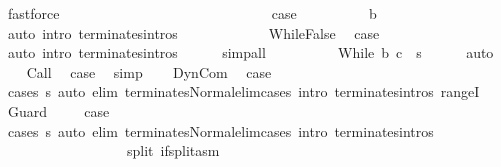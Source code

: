 \begin{isabellebody}
\ fastforce\isanewline
\ \ \ \ \ \ \ \ \isamarkupfalse%
\isanewline
\ \ \ \ \ \ \isacommand{{\isacharbraceright}}\isamarkupfalse%
\isanewline
\ \ \ \ \ \ \isamarkupfalse%
\isanewline
\ \ \ \ \ \ \isamarkupfalse%
\ {\isacharquery}case\isanewline
\ \ \ \ \ \ \ \ \isamarkupfalse%
\ b\isanewline
\ \ \ \ \ \ \ \ \isamarkupfalse%
\ {\isacharparenleft}auto\ intro{\isacharcolon}\ terminates{\isachardot}intros{\isacharparenright}\isanewline
\ \ \ \ \isamarkupfalse%
\isanewline
\ \ \ \ \ \ \isamarkupfalse%
\ WhileFalse\ \isamarkupfalse%
\ {\isacharquery}case\ \isamarkupfalse%
\ {\isacharparenleft}auto\ intro{\isacharcolon}\ terminates{\isachardot}intros{\isacharparenright}\isanewline
\ \ \ \ \isamarkupfalse%
\ simp{\isacharunderscore}all\isanewline
\ \ \isacommand{{\isacharbraceright}}\isamarkupfalse%
\ \isanewline
\ \ \isamarkupfalse%
\ \isamarkupfalse%
\ {\isachardoublequoteopen}{\isasymGamma}{\isasymturnstile}While\ b\ c\ {\isasymdown}\ s{\isachardoublequoteclose}\isanewline
\ \ \ \ \isamarkupfalse%
\ auto\isanewline
{}\isamarkupfalse%
\isanewline
\ \ \isamarkupfalse%
\ Call\ \isamarkupfalse%
\ {\isacharquery}case\ \isamarkupfalse%
\ simp\isanewline
{}\isamarkupfalse%
\isanewline
\ \ \isamarkupfalse%
\ DynCom\ \isamarkupfalse%
\ {\isacharquery}case\ \isanewline
\ \ \ \ \ \isamarkupfalse%
\ {\isacharparenleft}cases\ s{\isacharparenright}\ {\isacharparenleft}auto\ elim{\isacharcolon}\ terminates{\isacharunderscore}Normal{\isacharunderscore}elim{\isacharunderscore}cases\ intro{\isacharcolon}\ terminates{\isachardot}intros\ rangeI{\isacharparenright}\isanewline
{}\isamarkupfalse%
\isanewline
\ \ \isamarkupfalse%
\ Guard\ \isanewline
\ \ \isamarkupfalse%
\ {\isacharquery}case\isanewline
\ \ \ \ \isamarkupfalse%
\ {\isacharparenleft}cases\ s{\isacharparenright}\ {\isacharparenleft}auto\ elim{\isacharcolon}\ terminates{\isacharunderscore}Normal{\isacharunderscore}elim{\isacharunderscore}cases\ intro{\isacharcolon}\ terminates{\isachardot}intros\isanewline
\ \ \ \ \ \ \ \ \ \ \ \ \ \ \ \ \ \ split{\isacharcolon}\ if{\isacharunderscore}split{\isacharunderscore}asm{\isacharparenright}\isanewline
{}\isamarkupfalse%
\isanewline
\ \ \isamarkupfalse%

\end{isabellebody}
